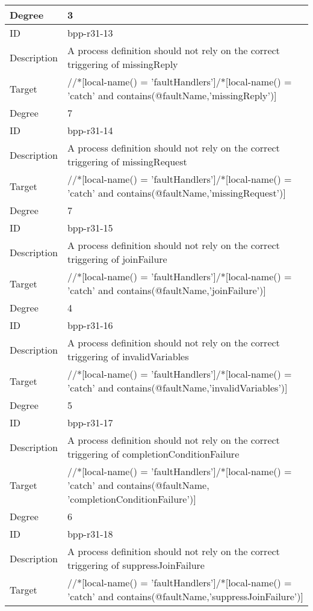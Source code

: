 \begin{center}
\begin{tiny}
\begin{longtable}{p{}|p{}}
\myrowcolour
Degree & 3\\
\midrule
ID & bpp-r31-13\\
\myrowcolour
Description &A process definition should not rely on the correct triggering of missingReply\\
Target & //*[local-name() = 'faultHandlers']/*[local-name() = 'catch' and contains(@faultName,'missingReply')]\\
\myrowcolour
Degree & 7\\
\midrule
ID & bpp-r31-14\\
\myrowcolour
Description &A process definition should not rely on the correct triggering of missingRequest\\
Target & //*[local-name() = 'faultHandlers']/*[local-name() = 'catch' and contains(@faultName,'missingRequest')]\\
\myrowcolour
Degree & 7\\
\midrule
ID & bpp-r31-15\\
\myrowcolour
Description &A process definition should not rely on the correct triggering of joinFailure\\
Target & //*[local-name() = 'faultHandlers']/*[local-name() = 'catch' and contains(@faultName,'joinFailure')]\\
\myrowcolour
Degree & 4\\
\midrule
ID & bpp-r31-16\\
\myrowcolour
Description &A process definition should not rely on the correct triggering of invalidVariables\\
Target & //*[local-name() = 'faultHandlers']/*[local-name() = 'catch' and contains(@faultName,'invalidVariables')]\\
\myrowcolour
Degree & 5\\
\midrule
ID & bpp-r31-17\\
\myrowcolour
Description &A process definition should not rely on the correct triggering of completionConditionFailure\\
Target & //*[local-name() = 'faultHandlers']/*[local-name() = 'catch' and contains(@faultName, 'completionConditionFailure')]\\
\myrowcolour
Degree & 6\\
\midrule
ID & bpp-r31-18\\
\myrowcolour
Description &A process definition should not rely on the correct triggering of suppressJoinFailure\\
Target & //*[local-name() = 'faultHandlers']/*[local-name() = 'catch' and contains(@faultName,'suppressJoinFailure')]\\

\end{longtable}
\end{tiny}
\end{center}

